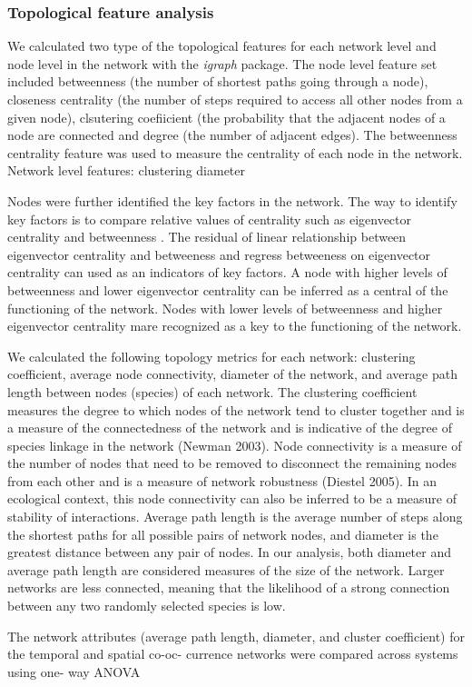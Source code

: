 \subsubsection{Topological feature analysis}

We calculated two type of the topological features for each network level and node level in the network with the \textit{igraph} package. The node level feature set included betweenness (the number of shortest paths going through a node), closeness centrality (the number of steps required to access all other nodes from a given node), clsutering coefiicient (the probability that the adjacent nodes of a node are connected and degree (the number of adjacent edges). The betweenness centrality feature was used to measure the centrality of each node in the network.
Network level features: clustering diameter

 Nodes were further identified the key factors in the network. The way to identify key factors is to compare relative values of centrality such as eigenvector centrality and betweenness \cite{Valente_2008_How}. The residual of linear relationship between eigenvector centrality and betweeness and regress betweeness on eigenvector centrality can used as an indicators of key factors. A node with higher levels of betweenness and lower eigenvector centrality can be inferred as a central of the functioning of the network. Nodes with lower levels of betweenness and higher eigenvector centrality mare recognized as a key to the functioning of the network. 


We calculated the following topology metrics for each network: clustering coefficient, average node connectivity, diameter of the network, and average path length between nodes (species) of each network. The clustering coefficient measures the degree to which nodes of the network tend to cluster together and is a measure of the connectedness of the network and is indicative of the degree of species linkage in the network (Newman 2003). Node connectivity is a measure of the number of nodes that need to be removed to disconnect the remaining nodes from each other and is a measure of network robustness (Diestel 2005). In an ecological context, this node connectivity can also be inferred to be a measure of stability of interactions. Average path length is the average number of steps along the shortest paths for all possible pairs of network nodes, and diameter is the greatest distance between any pair of nodes. In our analysis, both diameter and average path length are considered measures of the size of the network. Larger networks are less connected, meaning that the likelihood of a strong connection between any two randomly selected species is low.

The network attributes (average path length, diameter, and cluster coefficient) for the temporal and spatial co-oc- currence networks were compared across systems using one- way ANOVA





